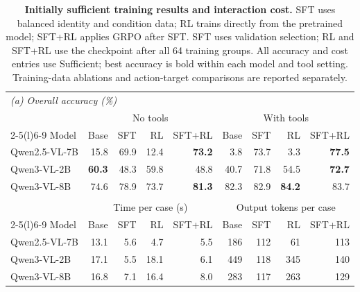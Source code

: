 \begin{table}[t]\centering\small\setlength{\tabcolsep}{5pt}
\begin{minipage}{.68\textwidth}\centering
\caption{\textbf{Initially sufficient training results and interaction cost.}
SFT uses balanced identity and condition data; RL trains directly from the pretrained model; SFT+RL applies GRPO after SFT.
SFT uses validation selection; RL and SFT+RL use the checkpoint after all 64 training groups. All accuracy and cost entries use Sufficient; best accuracy is bold within each model and tool setting.
Training-data ablations and action-target comparisons are reported separately.}
\label{tab:training-sufficient-detail}
\begin{tabular}{@{}l*{8}{r}@{}}
\toprule
\multicolumn{9}{l}{\emph{(a) Overall accuracy (\%)}}\\
 & \multicolumn{4}{c}{No tools} & \multicolumn{4}{c}{With tools}\\
\cmidrule(lr){2-5}\cmidrule(l){6-9}
Model & Base & SFT & RL & SFT+RL & Base & SFT & RL & SFT+RL\\
\midrule
Qwen2.5-VL-7B & 15.8 & 69.9 & 12.4 & \textbf{73.2} & 3.8 & 73.7 & 3.3 & \textbf{77.5}\\
Qwen3-VL-2B & \textbf{60.3} & 48.3 & 59.8 & 48.8 & 40.7 & 71.8 & 54.5 & \textbf{72.7}\\
Qwen3-VL-8B & 74.6 & 78.9 & 73.7 & \textbf{81.3} & 82.3 & 82.9 & \textbf{84.2} & 83.7\\
\addlinespace[6pt]
\multicolumn{9}{l}{\emph{(b) Interaction cost with tools}}\\
 & \multicolumn{4}{c}{Time per case (s)} & \multicolumn{4}{c}{Output tokens per case}\\
\cmidrule(lr){2-5}\cmidrule(l){6-9}
Model & Base & SFT & RL & SFT+RL & Base & SFT & RL & SFT+RL\\
\midrule
Qwen2.5-VL-7B & 13.1 & 5.6 & 4.7 & 5.5 & 186 & 112 & 61 & 113\\
Qwen3-VL-2B & 17.1 & 5.5 & 18.1 & 6.1 & 449 & 118 & 345 & 140\\
Qwen3-VL-8B & 16.8 & 7.1 & 16.4 & 8.0 & 283 & 117 & 263 & 129\\
\bottomrule
\end{tabular}\end{minipage}\end{table}
